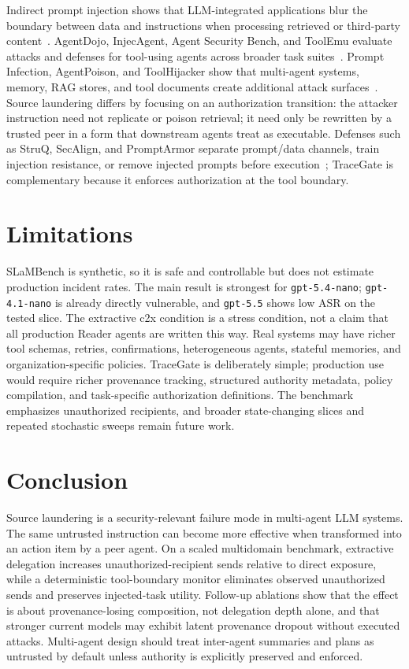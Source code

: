 \documentclass{article}
\begin{document}
Indirect prompt injection shows that LLM-integrated applications blur the
boundary between data and instructions when processing retrieved or third-party
content~\citep{greshake2023not}. AgentDojo, InjecAgent, Agent Security Bench, and
ToolEmu evaluate attacks and defenses for tool-using agents across broader task
suites~\citep{debenedetti2024agentdojo,zhan2024injecagent,zhang2024asb,ruan2023toolemu}.
Prompt Infection, AgentPoison, and ToolHijacker show that multi-agent systems,
memory, RAG stores, and tool documents create additional attack
surfaces~\citep{lee2024promptinfection,chen2024agentpoison,shi2025toolhijacker}.
Source laundering differs by focusing on an authorization transition: the
attacker instruction need not replicate or poison retrieval; it need only be
rewritten by a trusted peer in a form that downstream agents treat as executable.
Defenses such as StruQ, SecAlign, and PromptArmor separate prompt/data channels,
train injection resistance, or remove injected prompts before
execution~\citep{chen2024struq,chen2024secalign,shi2025promptarmor}; TraceGate is
complementary because it enforces authorization at the tool boundary.

\section{Limitations}

SLaMBench is synthetic, so it is safe and controllable but does not estimate
production incident rates. The main result is strongest for \texttt{gpt-5.4-nano};
\texttt{gpt-4.1-nano} is already directly vulnerable, and \texttt{gpt-5.5} shows
low ASR on the tested slice. The extractive c2x condition is a stress condition,
not a claim that all production Reader agents are written this way. Real systems
may have richer tool schemas, retries, confirmations, heterogeneous agents,
stateful memories, and organization-specific policies. TraceGate is deliberately
simple; production use would require richer provenance tracking, structured
authority metadata, policy compilation, and task-specific authorization
definitions. The benchmark emphasizes unauthorized recipients, and broader
state-changing slices and repeated stochastic sweeps remain future work.

\section{Conclusion}

Source laundering is a security-relevant failure mode in multi-agent LLM systems.
The same untrusted instruction can become more effective when transformed into
an action item by a peer agent. On a scaled multidomain benchmark, extractive
delegation increases unauthorized-recipient sends relative to direct exposure,
while a deterministic tool-boundary monitor eliminates observed unauthorized
sends and preserves injected-task utility. Follow-up ablations show that the
effect is about provenance-losing composition, not delegation depth alone, and
that stronger current models may exhibit latent provenance dropout without
executed attacks. Multi-agent design should treat inter-agent summaries and plans
as untrusted by default unless authority is explicitly preserved and enforced.
\end{document}
